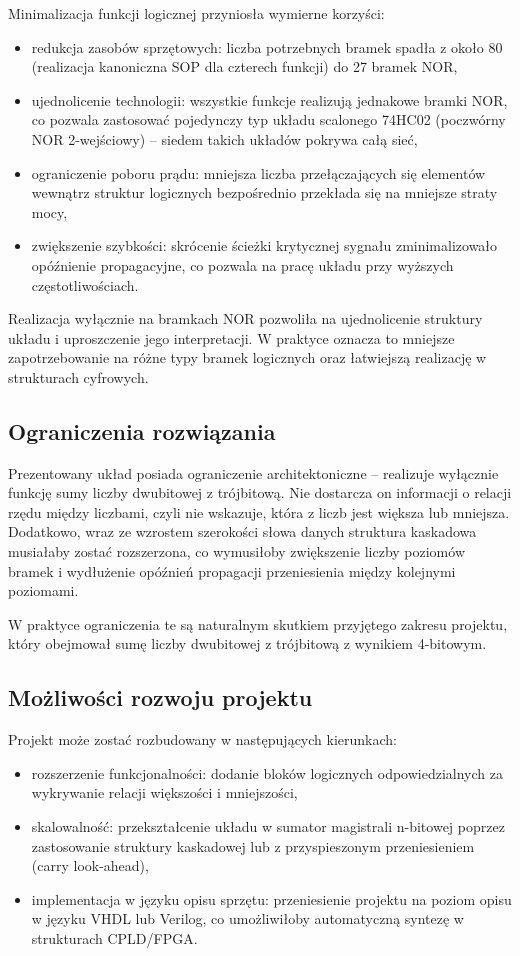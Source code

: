 \documentclass[11pt]{article}
\begin{document}
Minimalizacja funkcji logicznej przyniosła wymierne korzyści:
\begin{itemize}
    \item redukcja zasobów sprzętowych: liczba potrzebnych bramek spadła z około 80 (realizacja kanoniczna SOP dla czterech funkcji) do 27 bramek NOR,
    \item ujednolicenie technologii: wszystkie funkcje realizują jednakowe bramki NOR, co pozwala zastosować pojedynczy typ układu scalonego 74HC02 (poczwórny NOR 2-wejściowy) -- siedem takich układów pokrywa całą sieć,
    \item ograniczenie poboru prądu: mniejsza liczba przełączających się elementów wewnątrz struktur logicznych bezpośrednio przekłada się na mniejsze straty mocy,
    \item zwiększenie szybkości: skrócenie ścieżki krytycznej sygnału zminimalizowało opóźnienie propagacyjne, co pozwala na pracę układu przy wyższych częstotliwościach.
\end{itemize}

Realizacja wyłącznie na bramkach NOR pozwoliła na ujednolicenie struktury układu i uproszczenie jego interpretacji. W praktyce oznacza to mniejsze zapotrzebowanie na różne typy bramek logicznych oraz łatwiejszą realizację w strukturach cyfrowych.

\subsection{Ograniczenia rozwiązania}

Prezentowany układ posiada ograniczenie architektoniczne -- realizuje wyłącznie funkcję sumy liczby dwubitowej z trójbitową. Nie dostarcza on informacji o relacji rzędu między liczbami, czyli nie wskazuje, która z liczb jest większa lub mniejsza. Dodatkowo, wraz ze wzrostem szerokości słowa danych struktura kaskadowa musiałaby zostać rozszerzona, co wymusiłoby zwiększenie liczby poziomów bramek i wydłużenie opóźnień propagacji przeniesienia między kolejnymi poziomami.

W praktyce ograniczenia te są naturalnym skutkiem przyjętego zakresu projektu, który obejmował sumę liczby dwubitowej z trójbitową z wynikiem 4-bitowym.

\subsection{Możliwości rozwoju projektu}

Projekt może zostać rozbudowany w następujących kierunkach:
\begin{itemize}
    \item rozszerzenie funkcjonalności: dodanie bloków logicznych odpowiedzialnych za wykrywanie relacji większości i mniejszości,
    \item skalowalność: przekształcenie układu w sumator magistrali n-bitowej poprzez zastosowanie struktury kaskadowej lub z przyspieszonym przeniesieniem (carry look-ahead),
    \item implementacja w języku opisu sprzętu: przeniesienie projektu na poziom opisu w języku VHDL lub Verilog, co umożliwiłoby automatyczną syntezę w strukturach CPLD/FPGA.
\end{itemize}
\end{document}
